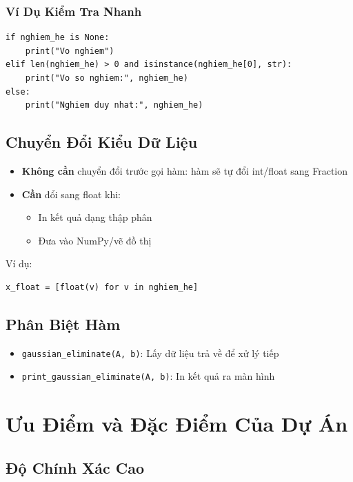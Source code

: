 \documentclass[12pt, a4paper, twoside]{article}
\begin{document}
\subsubsection{Ví Dụ Kiểm Tra Nhanh}

\begin{lstlisting}
if nghiem_he is None:
    print("Vo nghiem")
elif len(nghiem_he) > 0 and isinstance(nghiem_he[0], str):
    print("Vo so nghiem:", nghiem_he)
else:
    print("Nghiem duy nhat:", nghiem_he)
\end{lstlisting}

\subsection{Chuyển Đổi Kiểu Dữ Liệu}

\begin{itemize}
    \item \textbf{Không cần} chuyển đổi trước gọi hàm: hàm sẽ tự đổi int/float sang Fraction
    \item \textbf{Cần} đổi sang float khi:
    \begin{itemize}
        \item In kết quả dạng thập phân
        \item Đưa vào NumPy/vẽ đồ thị
    \end{itemize}
\end{itemize}

Ví dụ:
\begin{lstlisting}
x_float = [float(v) for v in nghiem_he]
\end{lstlisting}

\subsection{Phân Biệt Hàm}

\begin{itemize}
    \item \texttt{gaussian\_eliminate(A, b)}: Lấy dữ liệu trả về để xử lý tiếp
    \item \texttt{print\_gaussian\_eliminate(A, b)}: In kết quả ra màn hình
\end{itemize}

\newpage

\section{Ưu Điểm và Đặc Điểm Của Dự Án}

\subsection{Độ Chính Xác Cao}
\end{document}
